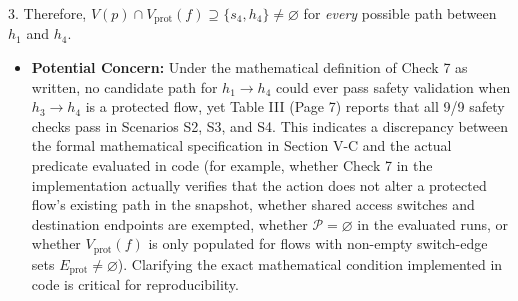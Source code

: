 \documentclass[11pt,a4paper]{article}
\begin{document}
3. Therefore, $V(p) \cap V_{\text{prot}}(f) \supseteq \{s_4, h_4\} \neq \varnothing$ for \emph{every} possible path between $h_1$ and $h_4$.
\begin{itemize}[leftmargin=1.8em,itemsep=2pt]
\item \textbf{Potential Concern:} Under the mathematical definition of Check 7 as written, no candidate path for $h_1 \to h_4$ could ever pass safety validation when $h_3 \to h_4$ is a protected flow, yet Table III (Page 7) reports that all 9/9 safety checks pass in Scenarios S2, S3, and S4. This indicates a discrepancy between the formal mathematical specification in Section V-C and the actual predicate evaluated in code (for example, whether Check 7 in the implementation actually verifies that the action does not alter a protected flow's existing path in the snapshot, whether shared access switches and destination endpoints are exempted, whether $\mathcal{P} = \varnothing$ in the evaluated runs, or whether $V_{\text{prot}}(f)$ is only populated for flows with non-empty switch-edge sets $E_{\text{prot}} \neq \varnothing$). Clarifying the exact mathematical condition implemented in code is critical for reproducibility.
\end{itemize}
\end{document}
